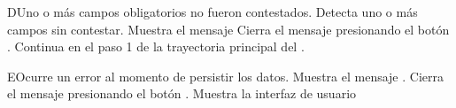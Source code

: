 \begin{UCtrayectoriaA}{D}{Uno o más campos obligatorios no fueron contestados.}
	\UCpaso Detecta uno o más campos sin contestar.
    \UCpaso Muestra el mensaje 
    \UCpaso[\UCactor] Cierra el mensaje presionando el botón .
    \UCpaso Continua en el paso 1 de la trayectoria principal del .
\end{UCtrayectoriaA}


\begin{UCtrayectoriaA}{E}{Ocurre un error al momento de persistir los datos.}
	\UCpaso Muestra el mensaje .
	\UCpaso[\UCactor] Cierra el mensaje presionando el botón .
	\UCpaso Muestra la interfaz de usuario 
\end{UCtrayectoriaA}
